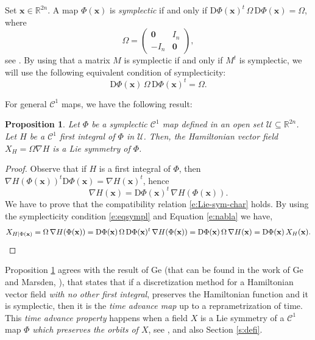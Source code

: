 \documentclass[11pt]{article}
\newtheorem {proposition} [theorem]{Proposition}
\begin{document}
Set $\mathbf{x}\in\mathbb{R}^{2n}$. A map $\Phi(\mathbf{x})$ is \emph{symplectic} if and only if
$\mathrm{D}\Phi(\mathbf{x})^t\,\Omega\,\mathrm{D}\Phi(\mathbf{x})=\Omega$, where
$$
\Omega=\left(\begin{array}{cc}
\mathbf{0} & {I_n}\\
-{I_n} & \mathbf{0}
\end{array}\right),
$$ see \cite{Marsden1999}. By using that a matrix $M$ is symplectic if and only if $M^t$ is symplectic, we will use the following equivalent condition of symplecticity:
\begin{equation}\label{e:eqsympl}
\mathrm{D}\Phi(\mathbf{x})\,\Omega\,\mathrm{D}\Phi(\mathbf{x})^t=\Omega.
\end{equation}






For general $\mathcal{C}^1$ maps, we have the following result:
\begin{proposition}\label{p:symplsL}
Let $\Phi$ be a symplectic $\mathcal{C}^1$ map defined in an open set $\mathcal{U}\subseteq \mathbb{R}^{2n}$. Let $H$ be a $\mathcal{C}^1$ first integral of $\Phi$ in $\mathcal{U}$. Then, the Hamiltonian vector field $X_H=\Omega\nabla H$ is a Lie symmetry of $\Phi$.
\end{proposition}
\begin{proof}
Observe that if $H$ is a first integral of $\Phi$, then $\nabla H(\Phi(\mathbf{x}))^t\mathrm{D}\Phi(\mathbf{x})=\nabla H(\mathbf{x})^t$, hence
\begin{equation}\label{e:nabla}
\nabla H(\mathbf{x})=\mathrm{D}\Phi(\mathbf{x})^{t}\, \nabla H(\Phi(\mathbf{x})).
\end{equation}
We have to prove that the compatibility relation \eqref{e:Lie-sym-char} holds. By using the symplecticity condition  \eqref{e:eqsympl} and Equation \eqref{e:nabla} we have,
$$
X_{H|\Phi({\bf{x}})}=\Omega\, \nabla H(\Phi(\mathbf{x}))={\mathrm D}\Phi({\bf{x}})\,\Omega\,{\mathrm D}\Phi({\bf{x}})^t\, \nabla H(\Phi(\mathbf{x}))= {\mathrm D}\Phi({\bf{x}})\,\Omega\,\nabla H(\mathbf{x})={\mathrm D}\Phi({\bf{x}})\,X_H({\bf{x}}).
$$
\end{proof}


Proposition \ref{p:symplsL} agrees with the result of Ge  (that can be found in the work of Ge and Marsden, \cite[p. 135]{GeMarsden}), that states that if a discretization method for a Hamiltonian vector field \emph{with no other first integral}, preserves the Hamiltonian function and it is symplectic, then it is the \emph{time advance map} up to a reprametrization of time. This \emph{time advance property} happens when a field $X$ is a Lie symmetry of a $\mathcal{C}^1$ map $\Phi$ \emph{which preserves the orbits of $X$}, see  \cite[Proposition 6]{CGM08}, and also Section \ref{s:defi}.
\end{document}
